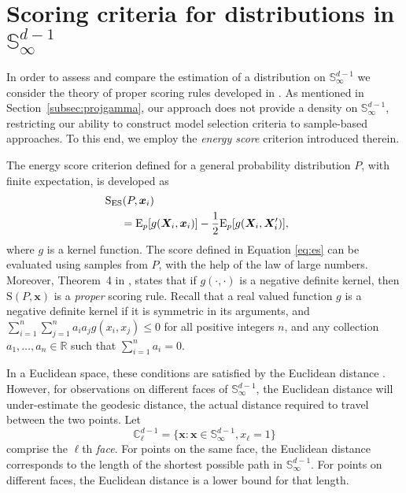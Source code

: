 \section{Scoring criteria for distributions in ${\mathbb S}_\infty^{d-1}$\label{sec:evaluation}}

In order to assess and compare the estimation of a distribution on ${\mathbb S}_\infty^{d-1}$ we consider 
    the theory of proper scoring rules developed in \cite{gneiting2007}. As mentioned in 
    Section~\ref{subsec:projgamma}, our approach does not provide a density on 
    ${\mathbb S}_{\infty}^{d-1}$, restricting our ability to construct model selection criteria 
    to sample-based approaches.  To this end, we employ the \emph{energy score} criterion introduced
    therein.

The energy score criterion defined for a general probability distribution $P$, with finite expectation, 
    is developed as
    \begin{equation}
    \label{eq:es}
    \begin{aligned}
    &\hspace{-0.5cm}\text{S}_{\text{ES}}\left(P, \bm{x}_i\right) \\
    &=\text{E}_p \left[g\left(\bm{X}_i, \bm{x}_i\right)\right] -
                                    \frac{1}{2}\text{E}_p \left[g\left(\bm{X}_i,\bm{X}_i^{\prime}\right)\right],
    \end{aligned}
    \end{equation}
where $g$ is a kernel function. The score defined in Equation \eqref{eq:es} can be evaluated
  using samples from $P$, with the help of the law of large numbers.
  Moreover, Theorem~4 in \cite{gneiting2007}, states that if $g(\cdot,\cdot)$ is a negative 
  definite kernel, then $\text{S}(P,\bm{x})$ is a \emph{proper} scoring rule.  Recall that a 
  real valued function $g$ is a negative definite kernel if it is symmetric in its arguments, 
  and $\sum_{i=1}^n\sum_{j=1}^na_ia_jg(x_i,x_j)\leq 0$ for all positive integers $n$, and any 
  collection $a_1,\ldots,a_n\in{\mathbb R}$ such that  $\sum_{i = 1}^na_i = 0$.  

In a Euclidean space, these conditions are satisfied by the Euclidean distance \citep{berg1984}. 
    However, for observations on different faces of ${\mathbb S}_{\infty}^{d-1}$, the Euclidean 
    distance will under-estimate the geodesic distance, the actual distance required to travel 
    between the two points.  Let
\begin{equation*}
    {\mathbb C}_{\ell}^{d-1} = \lbrace \bm{x} : \bm{x} \in {\mathbb S}_{\infty}^{d-1}, x_{\ell} = 1\rbrace
\end{equation*}
    comprise the $\ell$th \emph{face}.  For points on the same face, the Euclidean distance 
    corresponds to the length of the shortest possible path in ${\mathbb S}_{\infty}^{d-1}$.  
    For points on different faces, the Euclidean distance is a lower bound for that length.

